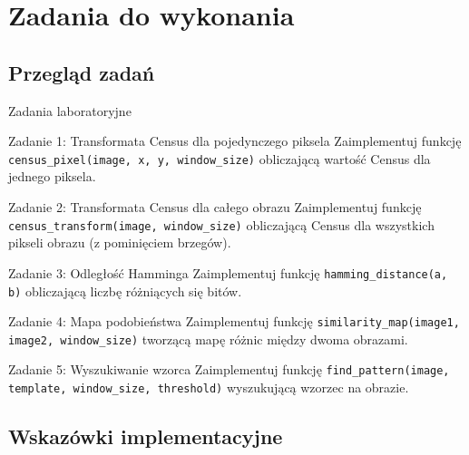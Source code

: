 \documentclass[9pt]{beamer}
\begin{document}
\section{Zadania do wykonania}

\subsection{Przegląd zadań}

\begin{frame}{Zadania laboratoryjne}
\begin{block}{Zadanie 1: Transformata Census dla pojedynczego piksela}
Zaimplementuj funkcję \texttt{census\_pixel(image, x, y, window\_size)} obliczającą wartość Census dla jednego piksela.
\end{block}

\pause

\begin{block}{Zadanie 2: Transformata Census dla całego obrazu}
Zaimplementuj funkcję \texttt{census\_transform(image, window\_size)} obliczającą Census dla wszystkich pikseli obrazu (z pominięciem brzegów).
\end{block}

\pause

\begin{block}{Zadanie 3: Odległość Hamminga}
Zaimplementuj funkcję \texttt{hamming\_distance(a, b)} obliczającą liczbę różniących się bitów.
\end{block}

\pause

\begin{block}{Zadanie 4: Mapa podobieństwa}
Zaimplementuj funkcję \texttt{similarity\_map(image1, image2, window\_size)} tworzącą mapę różnic między dwoma obrazami.
\end{block}

\pause

\begin{block}{Zadanie 5: Wyszukiwanie wzorca}
Zaimplementuj funkcję \texttt{find\_pattern(image, template, window\_size, threshold)} wyszukującą wzorzec na obrazie.
\end{block}

\end{frame}

\subsection{Wskazówki implementacyjne}
\end{document}

